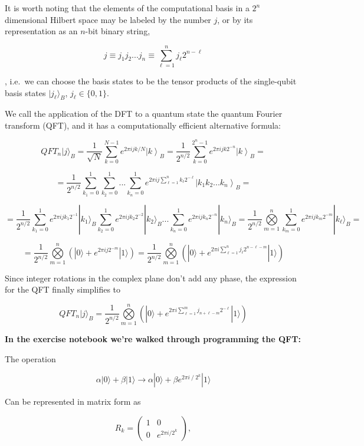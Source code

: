 \documentclass[11pt]{article}
\begin{document}
It is worth noting that the elements of the computational basis in a
\(2^n\) dimensional Hilbert space may be labeled by the number \(j\), or
by its representation as an \(n\)-bit binary string,

\[
j \equiv j_1 j_2 ... j_n \equiv \sum\limits_{\ell=1}^{n} j_\ell 2^{n-\ell}
\]

, i.e.~we can choose the basis states to be the tensor products of the
single-qubit basis states \(|j_\ell\rangle_B\), \(j_\ell\in\{0,1\}\).

We call the application of the DFT to a quantum state the quantum
Fourier transform (QFT), and it has a computationally efficient
alternative formula:

\[
QFT_n |j\rangle_{B} = \frac{1}{\sqrt{N}}\sum^{N-1}_{k=0} e^{2\pi i j k /N}\left|k\right\rangle_{B} = 
\frac{1}{2^{n/2}}\sum^{2^n-1}_{k=0} e^{2\pi i j k 2^{-n}}\left|k\right\rangle_{B} = 
\]

\[
= \frac{1}{2^{n/2}}\sum^{1}_{k_1=0}\sum^{1}_{k_2=0}...\sum^{1}_{k_n=0}
e^{2\pi i j \sum\limits_{\ell=1}^{n} k_\ell 2^{-\ell}}\left|k_1 k_2 ... k_n\right\rangle_{B} =
\]

\[
= \frac{1}{2^{n/2}}\sum^{1}_{k_1=0}e^{2\pi i j k_1 2^{-1}}|k_1\rangle_B
\sum^{1}_{k_2=0}e^{2\pi i j k_2 2^{-2}}|k_2\rangle_B... 
\sum^{1}_{k_n=0}e^{2\pi i j k_n 2^{-n}}|k_n\rangle_B = 
\frac{1}{2^{n/2}} \bigotimes\limits_{m=1}^{n}\sum\limits_{k_m=0}^1 e^{2\pi i j k_m 2^{-m}}|k_\ell\rangle_B = 
\]

\[
= \frac{1}{2^{n/2}} \bigotimes\limits_{m=1}^{n}\left(|0\rangle + e^{2\pi i j 2^{-m}}|1\rangle \right) = 
\frac{1}{2^{n/2}} \bigotimes\limits_{m=1}^{n}\left(|0\rangle + e^{2\pi i \sum\limits_{\ell=1}^n j_\ell 2^{n-\ell-m}}|1\rangle \right) 
\]

Since integer rotations in the complex plane don't add any phase, the
expression for the QFT finally simplifies to

\[
QFT_n |j\rangle_{B} = \frac{1}{2^{n/2}} \bigotimes\limits_{m=1}^{n}\left(|0\rangle + e^{2\pi i \sum\limits_{\ell=1}^{m} j_{n+\ell-m} 2^{-\ell}}|1\rangle \right) 
\]

    \textbf{In the exercise notebook we're walked through programming the
QFT:}

The operation

\[\alpha |0\rangle + \beta | 1 \rangle \rightarrow  \alpha | 0 \rangle +\beta e^{2\pi i\ /\ 2^k} | 1 \rangle \]

Can be represented in matrix form as

\[R_k = \begin{pmatrix}
1 & 0 \\
0 & e^{2\pi i /2^k}
\end{pmatrix},\]
\end{document}
